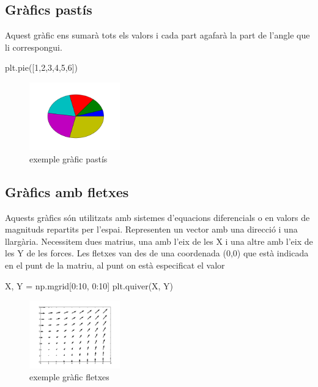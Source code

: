 \subsection{Gràfics pastís}
Aquest gràfic ens sumarà tots els valors i cada part agafarà la part de l'angle que li correspongui.
\begin{tip}[caption=Gràfic pastís]
plt.pie([1,2,3,4,5,6])
\end{tip}
\begin{figure}[!h]
    \begin{centering}
    \includegraphics[width=0.35\textwidth]{img/ex05.png}
    \caption{exemple gràfic pastís}
    \label{fig:figex05}
    \end{centering}
\end{figure}
\subsection{Gràfics  amb fletxes}
Aquests gràfics són utilitzats amb sistemes d'equacions diferencials o en valors de magnituds repartits per l'espai. Representen un vector amb una direcció i una llargària. Necessitem dues matrius, una amb l'eix de les X i una altre amb l'eix de les Y de les forces. Les fletxes van des de una coordenada (0,0) que està indicada en el punt de la matriu, al punt on està especificat el valor
\begin{tip}[caption=Gràfic fletxes]
X, Y = np.mgrid[0:10, 0:10]
plt.quiver(X, Y)
\end{tip}
\begin{figure}[!h]
    \begin{centering}
    \includegraphics[width=0.35\textwidth]{img/ex06.png}
    \caption{exemple gràfic fletxes}
    \label{fig:figex06}
    \end{centering}
\end{figure}
